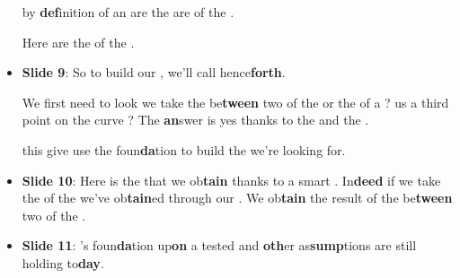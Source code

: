 \begin{itemize}
             by \textbf{def}inition  of an  are the 
             are  of the .

            Here are the  of the .
        \item \textbf{Slide 9}: So to build our ,  we'll call
             hence\textbf{forth}.

            We first need to
            look   we take the  be\textbf{tween}
            two
             of the  or
            the  of a  ?  us a third
            point on the curve ?
             The \textbf{an}swer is yes thanks to
            the  and the
            .

             this 
            give use the foun\textbf{da}tion
            to build the   we're looking for.
        \item \textbf{Slide 10}: Here is the  that we ob\textbf{tain}
            thanks to a smart . In\textbf{deed} if we take the
             of the  we've
            ob\textbf{tain}ed
            through our . We ob\textbf{tain} the result
            of the  be\textbf{tween} two
             of the .
        \item \textbf{Slide 11}: 's foun\textbf{da}tion
             up\textbf{on} a tested  and \textbf{oth}er as\textbf{sump}tions
             are still
            holding to\textbf{day}.
            

\end{itemize}

